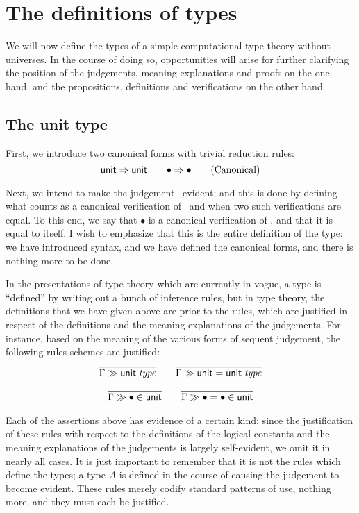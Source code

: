 \documentclass[main.tex]{subfiles}
\begin{document}
\section{The definitions of types}

We will now define the types of a simple computational type theory without
universes. In the course of doing so, opportunities will arise for further
clarifying the position of the judgements, meaning explanations and proofs on
the one hand, and the propositions, definitions and verifications on the other
hand.

\subsection{The unit type}

First, we introduce two canonical forms with trivial reduction rules:
\begin{equation}
  \mathsf{unit}\Rightarrow\mathsf{unit}\qquad
  \bullet\Rightarrow\bullet
  \tag{Canonical}
\end{equation}

Next, we intend to make the judgement \isset\tyunit\ evident; and this is done by
defining what counts as a canonical verification of \tyunit\ and when two such
verifications are equal. To this end, we say that $\bullet$ is a canonical
verification of \tyunit, and that it is equal to itself.  I wish to emphasize
that this is the entire definition of the type: we have introduced syntax, and
we have defined the canonical forms, and there is nothing more to be done.

In the presentations of type theory which are currently in vogue, a type is
``defined'' by writing out a bunch of inference rules, but in type theory, the
definitions that we have given above are prior to the rules, which are
justified in respect of the definitions and the meaning explanations of the
judgements. For instance, based on the meaning of the various forms of sequent
judgement, the following rules schemes are justified:
\begin{gather*}
  \infer{
    \sequent\Gamma\isset\tyunit
  }{
  }\qquad
  \infer{
    \sequent\Gamma\isset{\tyunit=\tyunit}
  }{
  }\\[6pt]
  \infer{
    \sequent\Gamma\ver\bullet\tyunit
  }{
  }\qquad
  \infer{
    \sequent\Gamma\ver{\bullet=\bullet}{\tyunit}
  }{
  }
\end{gather*}

Each of the assertions above has evidence of a certain kind; since the
justification of these rules with respect to the definitions of the logical
constants and the meaning explanations of the judgements is largely
self-evident, we omit it in nearly all cases. It is just important to remember
that it is not the rules which define the types; a type $A$ is defined in the
course of causing the judgement  to become evident.  These rules
merely codify standard patterns of use, nothing more, and they must each be
justified.
\end{document}
